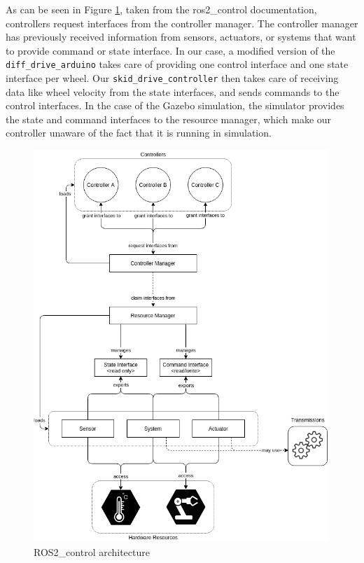 \documentclass[12pt]{article}
\begin{document}
        \noindent
        \begin{minipage}{0.45\textwidth}
            As can be seen in Figure \ref{fig:ros_control_diagram}, taken from the ros2\_control documentation, controllers request interfaces from the controller manager. The controller manager has previously received information from sensors, actuators, or systems that want to provide command or state interface. In our case, a modified version of the \texttt{diff\_drive\_arduino} takes care of providing one control interface and one state interface per wheel. Our \texttt{skid\_drive\_controller} then takes care of receiving data like wheel velocity from the state interfaces, and sends commands to the control interfaces. In the case of the Gazebo simulation, the simulator provides the state and command interfaces to the resource manager, which make our controller unaware of the fact that it is running in simulation.
        \end{minipage}%
        \hspace{3pt}
        \begin{minipage}{0.5\textwidth}
            \begin{figure}[H]
            \centering
                \includegraphics[width=0.99\textwidth]{Images/ros2_control.png}
                \caption{ROS2\_control architecture}
                \label{fig:ros_control_diagram}
                \end{figure}
        \end{minipage}
\end{document}
